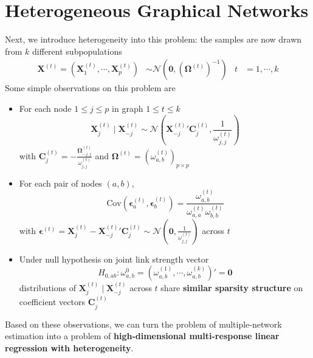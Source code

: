 \documentclass[twoside]{article}
\begin{document}
\section{Heterogeneous Graphical Networks}
Next, we introduce heterogeneity into this problem: the samples are now drawn from $k$ different subpopulations
\begin{align*}
    \mathbf{X}^{(t)} = \left( \mathbf{X}^{(t)}_1,\cdots,\mathbf{X}^{(t)}_p \right) &\sim \mathcal{N}\left(\mathbf{0},\left(\boldsymbol{\Omega}^{(t)}\right)^{-1}\right) & t&=1,\cdots, k
\end{align*}
Some simple observations on this problem are
\begin{itemize}
    \item For each node $1\leq j \leq p$ in graph $1\leq t\leq k$ $$ \mathbf{X}^{(t)}_j\mid \mathbf{X}^{(t)}_{-j} \sim \mathcal{N}\left( {\mathbf{X}^{(t)}_{-j} }'\mathbf{C}^{(t)}_j,\frac{1}{\omega_{j,j}^{(t)}} \right) $$ with $\mathbf{C}_j^{(t)} = -\frac{\boldsymbol{\Omega}^{(t)}_{-j,j}}{\omega_{j,j}^{(t)}}$ and $\boldsymbol{\Omega}^{(t)} = \left( \omega_{a,b}^{(t)} \right)_{p\times p}$
    \item For each pair of nodes $(a,b)$, $$ \mathrm{Cov}\left( \boldsymbol{\epsilon}_a^{(t)},\boldsymbol{\epsilon}_b^{(t)} \right) = \frac{\omega^{(t)}_{a,b}}{\omega^{(t)}_{a,a}\omega^{(t)}_{b,b}} $$ with $\boldsymbol{\epsilon}^{(t)} = \mathbf{X}^{(t)}_j- {\mathbf{X}^{(t)}_{-j}}' \mathbf{C}^{(t)}_j \sim \mathcal{N}\left( \mathbf{0},\frac{1}{\omega_{j,j}^{(t)}} \right)$  across $t$
    \item Under null hypothesis on joint link strength vector $$H_{0,ab}: \omega^0_{a,b} = \left( \omega^{(1)}_{a,b},\cdots,\omega_{a,b}^{(k)} \right)' = \mathbf{0} $$ distributions of $\mathbf{X}^{(t)}_j\mid \mathbf{X}^{(t)}_{-j}$ across $t$ share \textbf{similar sparsity structure} on coefficient vectors $\mathbf{C}_j^{(t)}$
\end{itemize}
Based on these observations, we can turn the problem of multiple-network estimation into a problem of \textbf{high-dimensional multi-response linear regression with heterogeneity}.
\end{document}
